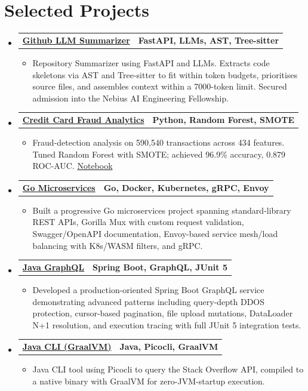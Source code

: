 \documentclass[letterpaper,11pt]{article}
\makeatletter
\newcommand{\resumeItem}[1]{
  \item\small{
    {#1 \vspace{-3pt}}
  }
}
\newcommand{\resumeProjectHeading}[2]{
  \vspace{-3pt}\item
    \begin{tabular*}{1.0\textwidth}[t]{l@{\extracolsep{\fill}}r}
      \textbf{#1} & \textbf{\small #2} \\
    \end{tabular*}\vspace{-7pt}
}
\newcommand{\resumeSubHeadingListStart}{\begin{itemize}[leftmargin=0.0in, label={}]}
\newcommand{\resumeSubHeadingListEnd}{\end{itemize}}
\newcommand{\resumeItemListStart}{\begin{itemize}}
\newcommand{\resumeItemListEnd}{\end{itemize}\vspace{0pt}}
\makeatother
\begin{document}
\section{Selected Projects}
\resumeSubHeadingListStart
    \resumeProjectHeading
        {\href{https://github.com/aymanapatel/nebius-project}{\textbf{Github LLM Summarizer}}}{FastAPI, LLMs, AST, Tree-sitter}
        \resumeItemListStart
            \resumeItem{Repository Summarizer using FastAPI and LLMs. Extracts code skeletons via AST and Tree-sitter to fit within token budgets, prioritises source files, and assembles context within a 7000-token limit. Secured admission into the Nebius AI Engineering Fellowship.}
        \resumeItemListEnd
    \resumeProjectHeading
        {\href{https://github.com/aymanapatel/qmul-all-projects/blob/main/data-analytics/coursework1/credit-card-report.pdf}{\textbf{Credit Card Fraud Analytics}}}{Python, Random Forest, SMOTE}
        \resumeItemListStart
            \resumeItem{Fraud-detection analysis on 590,540 transactions across 434 features. Tuned Random Forest with SMOTE; achieved 96.9\% accuracy, 0.879 ROC-AUC. \href{https://github.com/aymanapatel/qmul-all-projects/blob/main/data-analytics/coursework1/credit-card-notebook.ipynb}{Notebook}}
        \resumeItemListEnd
    \resumeProjectHeading
        {\href{https://github.com/aymanapatel/golang-microservices}{\textbf{Go Microservices}}}{Go, Docker, Kubernetes, gRPC, Envoy}
        \resumeItemListStart
            \resumeItem{Built a progressive Go microservices project spanning standard-library REST APIs, Gorilla Mux with custom request validation, Swagger/OpenAPI documentation, Envoy-based service mesh/load balancing with K8s/WASM filters, and gRPC.}
        \resumeItemListEnd
    \resumeProjectHeading
        {\href{https://github.com/aymanapatel/graphql-app}{\textbf{Java GraphQL}}}{Spring Boot, GraphQL, JUnit 5}
        \resumeItemListStart
            \resumeItem{Developed a production-oriented Spring Boot GraphQL service demonstrating advanced patterns including query-depth DDOS protection, cursor-based pagination, file upload mutations, DataLoader N+1 resolution, and execution tracing with full JUnit 5 integration tests.}
        \resumeItemListEnd
    \resumeProjectHeading
        {\href{https://github.com/aymanapatel/java-cli}{\textbf{Java CLI (GraalVM)}}}{Java, Picocli, GraalVM}
        \resumeItemListStart
            \resumeItem{Java CLI tool using Picocli to query the Stack Overflow API, compiled to a native binary with GraalVM for zero-JVM-startup execution.}
        \resumeItemListEnd
\resumeSubHeadingListEnd
\end{document}
